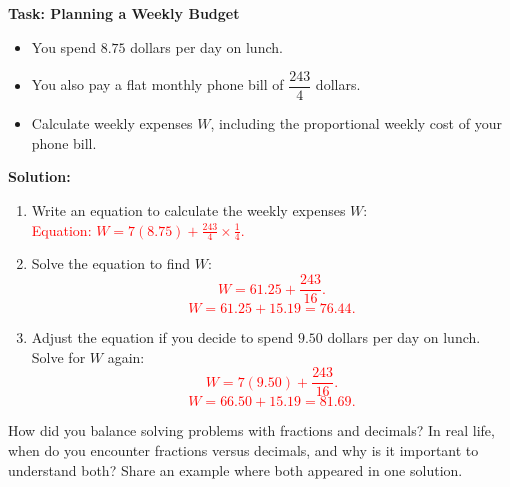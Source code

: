 \documentclass[12pt]{article}
\begin{document}
\begin{tcolorbox}[colframe=black!60, colback=white, 
coltitle=black, colbacktitle=black!15, fonttitle=\bfseries\Large, 
title=Performance Task - Answer Key, halign title=center, left=10pt, right=10pt, top=10pt, bottom=100pt]
\textbf{Task: Planning a Weekly Budget}
\begin{itemize}
    \item You spend \( 8.75 \) dollars per day on lunch.
    \item You also pay a flat monthly phone bill of \( \dfrac{243}{4} \) dollars.
    \item Calculate weekly expenses \(W\), including the proportional weekly cost of your phone bill.
\end{itemize}

\textbf{Solution:}
\begin{enumerate}[itemsep=4em]
    \item Write an equation to calculate the weekly expenses \(W\):\\
    \textcolor{red}{Equation: \( W = 7(8.75) + \frac{243}{4} \times \frac{1}{4} \).}

    \item Solve the equation to find \(W\):\\
    \textcolor{red}{\[
    W = 61.25 + \frac{243}{16}.
    \]}
    \textcolor{red}{\[
    W = 61.25 + 15.19 = 76.44.
    \]}

    \item Adjust the equation if you decide to spend \( 9.50 \) dollars per day on lunch. Solve for \(W\) again:\\
    \textcolor{red}{\[
    W = 7(9.50) + \frac{243}{16}.
    \]}
    \textcolor{red}{\[
    W = 66.50 + 15.19 = 81.69.
    \]}
\end{enumerate}
\end{tcolorbox}

\vspace{1em}

\begin{tcolorbox}[colframe=black!60, colback=white, 
coltitle=black, colbacktitle=black!15, fonttitle=\bfseries\Large, 
title=Reflection, halign title=center, left=10pt, right=10pt, top=10pt, bottom=100pt]
How did you balance solving problems with fractions and decimals? In real life, when do you encounter fractions versus decimals, and why is it important to understand both? Share an example where both appeared in one solution.
\end{tcolorbox}
\end{document}
